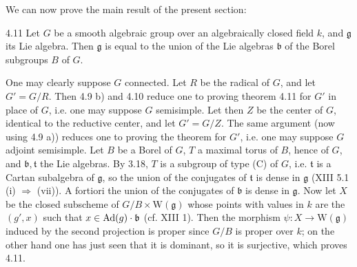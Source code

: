 We can now prove the main
result of the present section:
\begin{theorem}{4.11}\label{XIV.4.11}
Let $G$ be a smooth
algebraic group over an
algebraically closed field
$k$, and $\mathfrak g$
its Lie algebra. Then
$\mathfrak g$ is equal
to the union of the
Lie algebras $\mathfrak b$
of the Borel subgroups
$B$ of $G$.
\end{theorem}
One may clearly suppose
$G$ connected. Let $R$
be the radical of $G$,
and let $G'=G/R$.
Then 4.9 b) and 4.10
reduce one to proving
theorem 4.11 for $G'$
in place of $G$, i.e.
one may suppose $G$
semisimple. Let then
$Z$ be the center of
$G$, identical to the
reductive center, and
let $G'=G/Z$.
The same argument
(now using 4.9 a))
reduces one to proving
the theorem for $G'$,
i.e. one may suppose
$G$ adjoint semisimple.
Let $B$ be a Borel
of $G$, $T$ a maximal
torus of $B$, hence
of $G$, and
$\mathfrak b,\mathfrak t$
the Lie algebras.
By 3.18, $T$ is a
subgroup of type (C)
of $G$, i.e.
$\mathfrak t$ is a
Cartan subalgebra of
$\mathfrak g$, so
the union of the
conjugates of
$\mathfrak t$ is
dense in $\mathfrak g$
(XIII 5.1 (i)
$\Rightarrow$ (vii)).
A fortiori the union
of the conjugates of
$\mathfrak b$ is
dense in $\mathfrak g$.
Now let $X$ be the
closed subscheme of
$G/B\times\mathrm W(\mathfrak g)$
whose points with
values in $k$ are
the $(g',x)$ such
that $x\in\operatorname{Ad}(g)\cdot\mathfrak b$
(cf. XIII 1).
Then the morphism
$\psi:X\to\mathrm W(\mathfrak g)$
induced by the
second projection
is proper since
$G/B$ is proper
over $k$; on the
other hand one has
just seen that it
is dominant, so
it is surjective,
which proves 4.11.

